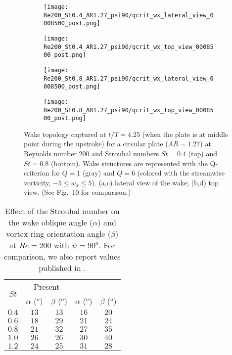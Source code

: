 \begin{figure}[!h]
  \centering
  \begin{subfigure}[]{0.45\textwidth}
    \centering
    \texttt{[image: Re200\_St0.4\_AR1.27\_psi90/qcrit\_wx\_lateral\_view\_0008500\_post.png]}
    \caption{}
    \label{fig:strouhal_wake_topology:0.4_lateral}
  \end{subfigure}
  \hfill
  \begin{subfigure}[]{0.45\textwidth}
    \centering
    \texttt{[image: Re200\_St0.4\_AR1.27\_psi90/qcrit\_wx\_top\_view\_0008500\_post.png]}
    \caption{}
    \label{fig:strouhal_wake_topology:0.4_top}
  \end{subfigure}
  \vspace{1cm}
  \begin{subfigure}[]{0.45\textwidth}
    \centering
    \texttt{[image: Re200\_St0.8\_AR1.27\_psi90/qcrit\_wx\_lateral\_view\_0008500\_post.png]}
    \caption{}
    \label{fig:strouhal_wake_topology:0.8_lateral}
  \end{subfigure}
  \hfill
  \begin{subfigure}[]{0.45\textwidth}
    \centering
    \texttt{[image: Re200\_St0.8\_AR1.27\_psi90/qcrit\_wx\_top\_view\_0008500\_post.png]}
    \caption{}
    \label{fig:strouhal_wake_topology:0.8_top}
  \end{subfigure}
  \caption{Wake topology captured at $t / T = 4.25$ (when the plate is at middle point during the upstroke) for a circular plate ($AR = 1.27$) at Reynolds number $200$ and Strouhal numbers $St = 0.4$ (top) and $St = 0.8$ (bottom). Wake structures are represented with the Q-criterion for $Q = 1$ (gray) and $Q = 6$ (colored with the streamwise vorticity, $-5 \leq w_x \leq 5$). (a,c) lateral view of the wake; (b,d) top view. (See Fig.~10 \citet{li_dong_2016} for comparison.)}
  \label{fig:strouhal_wake_topology}
\end{figure}

\begin{table}[!h]
  \centering
  \begin{tabular}{ccccc}
    \hline\hline
    \multirow{2}{*}{$St$} &
      \multicolumn{2}{c}{Present} &
      \multicolumn{2}{c}{\citet{li_dong_2016}} \\
    & $\alpha$ ($^o$) & $\beta$ ($^o$) & $\alpha$ ($^o$) & $\beta$ ($^o$) \\
    \hline
    $0.4$ & $13$ & $13$ & $16$ & $20$ \\
    $0.6$ & $18$ & $29$ & $21$ & $24$ \\
    $0.8$ & $21$ & $32$ & $27$ & $35$ \\
    $1.0$ & $26$ & $26$ & $30$ & $40$ \\
    $1.2$ & $24$ & $25$ & $31$ & $28$ \\
    \hline\hline
  \end{tabular}
  \caption{Effect of the Strouhal number on the wake oblique angle ($\alpha$) and vortex ring orientation angle ($\beta$) at $Re = 200$ with $\psi = 90^o$. For comparison, we also report values published in \citet{li_dong_2016}.}
  \label{tab:strouhal_angles}
\end{table}

